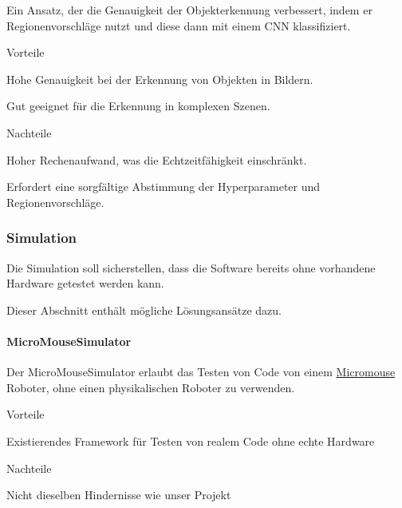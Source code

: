 \documentclass[../main.tex]{subfiles}
\begin{document}
Ein Ansatz, der die Genauigkeit der Objekterkennung verbessert, indem er Regionenvorschläge nutzt und diese dann mit einem CNN klassifiziert.

\begin{minipage}[t]{0.48\textwidth}
    \begin{items}
      \item [Vorteile]
      \item Hohe Genauigkeit bei der Erkennung von Objekten in Bildern.
      \item Gut geeignet für die Erkennung in komplexen Szenen.
    \end{items}
\end{minipage}
\hfill
\begin{minipage}[t]{0.48\textwidth}
    \begin{items}
      \item [Nachteile]
      \item Hoher Rechenaufwand, was die Echtzeitfähigkeit einschränkt.
      \item Erfordert eine sorgfältige Abstimmung der Hyperparameter und Regionenvorschläge.
    \end{items}
\end{minipage}

\newpage
\subsubsection{Simulation}

Die Simulation soll sicherstellen, dass die Software bereits ohne vorhandene Hardware getestet werden kann.

Dieser Abschnitt enthält mögliche Lösungsansätze dazu.

\paragraph{MicroMouseSimulator}

Der MicroMouseSimulator erlaubt das Testen von Code von einem \href{https://en.wikipedia.org/wiki/Micromouse}{Micromouse} Roboter,
ohne einen physikalischen Roboter zu verwenden.

\begin{minipage}[t]{0.48\textwidth}
    \begin{items}
      \item [Vorteile]
      \item Existierendes Framework für Testen von realem Code ohne echte Hardware
    \end{items}
\end{minipage}
\hfill
\begin{minipage}[t]{0.48\textwidth}
    \begin{items}
      \item [Nachteile]
      \item Nicht dieselben Hindernisse wie unser Projekt
    \end{items}
\end{minipage}
\end{document}
